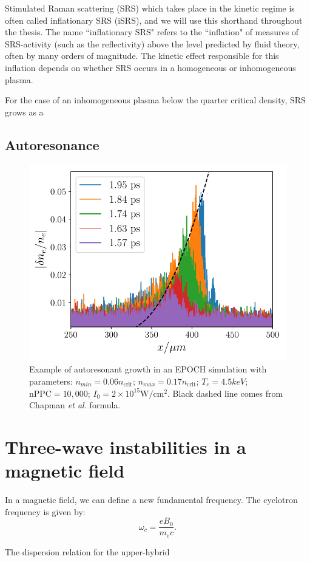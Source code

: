 Stimulated Raman scattering (\acrshort{SRS}) which takes place in the kinetic regime is often called inflationary SRS (\acrshort{iSRS}), and we will use this shorthand throughout the thesis. The name ``inflationary SRS" refers to the ``inflation" of measures of SRS-activity (such as the reflectivity) above the level predicted by fluid theory, often by many orders of magnitude. The kinetic effect responsible for this inflation depends on whether SRS occurs in a homogeneous or inhomogeneous plasma.

For the case of an inhomogeneous plasma below the quarter critical density, SRS grows as a 




\subsection{Autoresonance}

\begin{figure}[ht]
    \centering
    \includegraphics[width=0.8\columnwidth]{Chapters/C2_Theory/AR_diagnostic.pdf}
    \caption{Example of autoresonant growth in an EPOCH simulation with parameters: $n_{min} = 0.06 n_{\text{crit}}$; $n_{max} = 0.17 n_{\text{crit}}$; $T_e = 4.5\si{keV}$; $\text{nPPC}=10,000$; $I_0 = 2 \times 10^{15}\si{\watt / \centi\metre^2}$. Black dashed line comes from Chapman \textit{et al.} \citep{Chapman2012} formula.}
    \label{fig:AR_diagnostic}
\end{figure}{}


\section{Three-wave instabilities in a magnetic field}

In a magnetic field, we can define a new fundamental frequency. The cyclotron frequency is given by:
\begin{equation}
\omega_c = \frac{eB_0}{m_ec}.
\end{equation}

The dispersion relation for the upper-hybrid 



%
%
